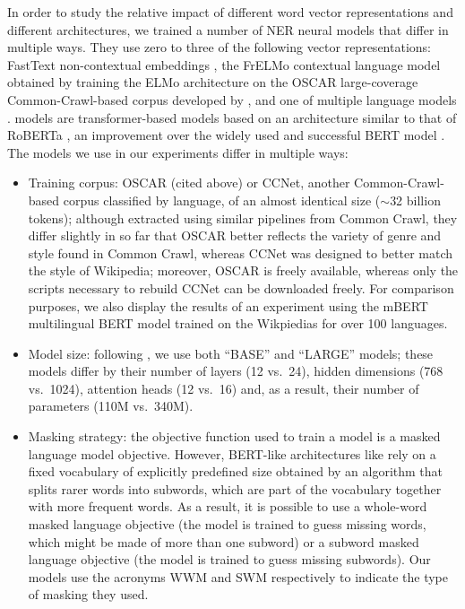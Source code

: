 In order to study the relative impact of different word vector representations and different architectures, we trained a number of NER neural models that differ in multiple ways. They use zero to three of the following vector representations: FastText non-contextual embeddings \cite{bojanowski-etal-2017-enriching}, the FrELMo contextual language model obtained by training the ELMo architecture on the OSCAR large-coverage Common-Crawl-based corpus developed by , and one of multiple \camembert language models \cite{martin-etal-2020-camembert}. \camembert models are transformer-based models based on an architecture similar to that of RoBERTa \cite{liu-etal-2019-roberta}, an improvement over the widely used and successful BERT model \cite{devlin-etal-2019-bert}. The \camembert models we use in our experiments differ in multiple ways:
\begin{itemize}
    \item Training corpus: OSCAR (cited above) or CCNet, another Common-Crawl-based corpus \cite{wenzek-etal-2020-ccnet} classified by language, of an almost identical size ($\sim$32 billion tokens); although extracted using similar pipelines from Common Crawl, they differ slightly in so far that OSCAR better reflects the variety of genre and style found in Common Crawl, whereas CCNet was designed to better match the style of Wikipedia; moreover, OSCAR is freely available, whereas only the scripts necessary to rebuild CCNet can be downloaded freely. For comparison purposes, we also display the results of an experiment using the mBERT multilingual BERT model trained on the Wikpiedias for over 100 languages.
    \item Model size: following , we use both ``BASE'' and ``LARGE'' models; these models differ by their number of layers (12 vs.~24), hidden dimensions (768 vs.~1024), attention heads (12 vs.~16) and, as a result, their number of parameters (110M vs.~340M).
    \item Masking strategy: the objective function used to train a \camembert model is a masked language model objective. However, BERT-like architectures like \camembert rely on a fixed vocabulary of explicitly predefined size obtained by an algorithm that splits rarer words into subwords, which are part of the vocabulary together with more frequent words. As a result, it is possible to use a whole-word masked language objective (the model is trained to guess missing words, which might be made of more than one subword) or a subword masked language objective (the model is trained to guess missing subwords). Our models use the acronyms WWM and SWM respectively to indicate the type of masking they used.
\end{itemize}

